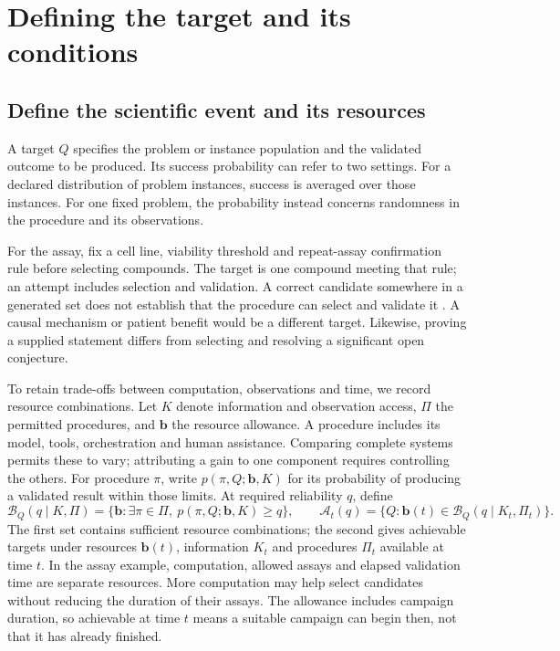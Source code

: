 \section{Defining the target and its conditions}
\label{sec:complexity}
\subsection{Define the scientific event and its resources}
A target $Q$ specifies the problem or instance population and the validated outcome to be produced. Its success probability can refer to two settings. For a declared distribution of problem instances, success is averaged over those instances. For one fixed problem, the probability instead concerns randomness in the procedure and its observations.

For the assay, fix a cell line, viability threshold and repeat-assay confirmation rule before selecting compounds. The target is one compound meeting that rule; an attempt includes selection and validation. A correct candidate somewhere in a generated set does not establish that the procedure can select and validate it \citep{dorner2026roc}. A causal mechanism or patient benefit would be a different target. Likewise, proving a supplied statement differs from selecting and resolving a significant open conjecture. 

To retain trade-offs between computation, observations and time, we record resource combinations. Let $K$ denote information and observation access, $\Pi$ the permitted procedures, and $\mathbf b$ the resource allowance. A procedure includes its model, tools, orchestration and human assistance. Comparing complete systems permits these to vary; attributing a gain to one component requires controlling the others. For procedure $\pi$, write $p(\pi,Q;\mathbf b,K)$ for its probability of producing a validated result within those limits. At required reliability $q$, define
\begin{equation}
 \mathcal B_Q(q\mid K,\Pi)=\{\mathbf b:\exists\pi\in\Pi,\ p(\pi,Q;\mathbf b,K)\ge q\},\qquad
 \mathcal A_t(q)=\{Q:\mathbf b(t)\in\mathcal B_Q(q\mid K_t,\Pi_t)\}.
 \label{eq:complexityset}
\end{equation}
\label{eq:attainable}
The first set contains sufficient resource combinations; the second gives achievable targets under resources $\mathbf b(t)$, information $K_t$ and procedures $\Pi_t$ available at time $t$. In the assay example, computation, allowed assays and elapsed validation time are separate resources. More computation may help select candidates without reducing the duration of their assays. The allowance includes campaign duration, so achievable at time $t$ means a suitable campaign can begin then, not that it has already finished. 

